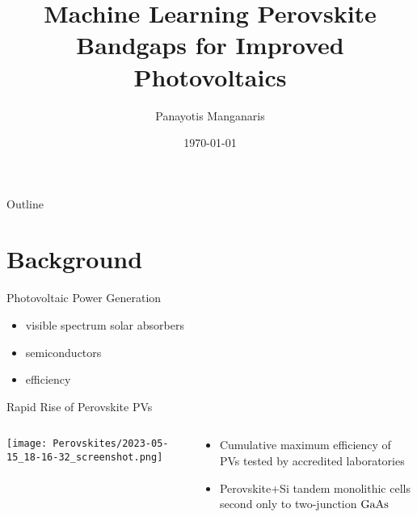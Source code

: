 \documentclass[10pt, aspectratio=169, presentation]{beamer}
\institute[Mannodi Group]{
\inst{1} Purdue Materials Engineering\\Professor Arun Mannodi-Kanakkithodi
}
\author{Panayotis Manganaris\inst{1}}
\date{\today}
\title{Machine Learning Perovskite Bandgaps for Improved Photovoltaics}
\begin{document}
\maketitle
\begin{frame}{Outline}
\tableofcontents
\end{frame}

\section{Background}
\label{sec:orgb2331fb}
\begin{frame}[label={sec:orgd7f75f9}]{Photovoltaic Power Generation}
\begin{itemize}
\item visible spectrum solar absorbers
\item semiconductors
\item efficiency
\end{itemize}
\end{frame}
\begin{frame}[label={sec:orgf8abbd6}]{Rapid Rise of Perovskite PVs}
\begin{columns}
\begin{column}{0.6\columnwidth}
\begin{center}
\texttt{[image: Perovskites/2023-05-15\_18-16-32\_screenshot.png]}
\end{center}
\end{column}

\begin{column}{0.4\columnwidth}
\begin{itemize}
\item Cumulative maximum efficiency of PVs tested by accredited laboratories\autocite{research-2023-best-resear}
\item Perovskite+Si tandem monolithic cells second only to two-junction \(\ce{GaAs}\)
\end{itemize}
\end{column}
\end{columns}
\end{frame}
\end{document}
